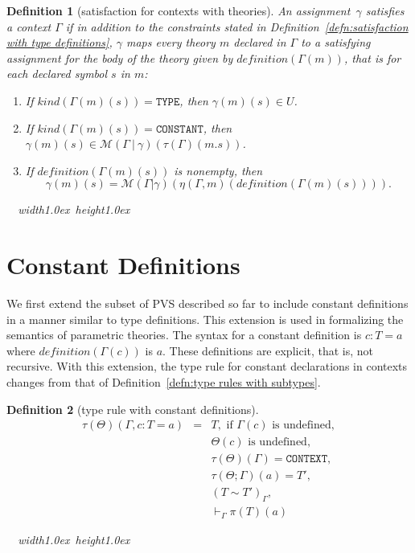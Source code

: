 \documentclass [12pt,twoside]{cslreport}
\newcommand{\thmbox}
   {{\ \hfill\hbox{%
      \vrule width1.0ex height1.0ex
   }\parfillskip 0pt }}
\newcommand{\tttrue}{\mathtt{TRUE}}
\newcommand{\tttype}{\mathtt{TYPE}}
\newcommand{\ttcontext}{\mathtt{CONTEXT}}
\newcommand{\ttconstant}{\mathtt{CONSTANT}}
\newcommand{\itkind}{\textit{kind}}
\newcommand{\itdef}{\textit{definition}}
\newcommand{\vbar}{\ |\ }
\newtheorem{definition}{Definition}
\newenvironment{Defn}[1]{\begin{definition}[#1]\label{defn:#1}}{
\thmbox\end{definition}}
\begin{document}
\begin{Defn}{satisfaction for contexts with theories}
An assignment~$\gamma$ satisfies a context $\Gamma$ if in addition to the 
constraints stated in
Definition~\ref{defn:satisfaction with type definitions}, $\gamma$ maps 
every theory $m$  declared in $\Gamma$ to 
a satisfying assignment for the body of the theory given by $
\itdef{}(\Gamma(m))$, that is for each declared symbol $s$ in $m$:
\begin{enumerate}
\item If $ \itkind{}(\Gamma(m)(s)) = \tttype{}$, then $\gamma(m)(s)
\in U$.


\item If $\itkind{}(\Gamma(m)(s)) = \ttconstant{}$, then $\gamma(m)(s)
\in \mathcal{M}(\Gamma\vbar\gamma)(\tau(\Gamma)(m.s))$.

\item  If  $\itdef{}(\Gamma(m)(s))$ is nonempty,
then $$\gamma(m)(s) = \mathcal{M}(\Gamma| \gamma)(
\eta(\Gamma, m)(\itdef{}(\Gamma(m)(s)))).$$
\end{enumerate}
\end{Defn}


\section{Constant Definitions}  We first extend the subset of PVS
described so far to include 
constant definitions in a manner similar to type definitions.
This extension is used in formalizing the semantics of parametric theories.
The syntax
for a constant definition is $c : T = a$ where $\itdef{}(\Gamma(c))$ is
$a$\@.  These definitions are explicit, that is, not recursive.  With this
extension, the type rule for constant declarations in contexts changes
from that of Definition~\ref{defn:type rules with subtypes}.
\begin{Defn}{type rule with constant definitions}
\begin{eqnarray*}
\tau(\Theta)(\Gamma, c : T = a) & = & T, \mbox{ if } \Gamma(c) \mbox{ is
undefined}, \\& & \Theta(c) \mbox{ is undefined}, \\& &
\tau(\Theta)(\Gamma) = \ttcontext,\\& &
\tau(\Theta;\Gamma)(a) = T',\\& & 
(T\sim T')_\Gamma,\\& &
\vdash_\Gamma \pi(T)(a)
\end{eqnarray*}
\end{Defn}
\end{document}

